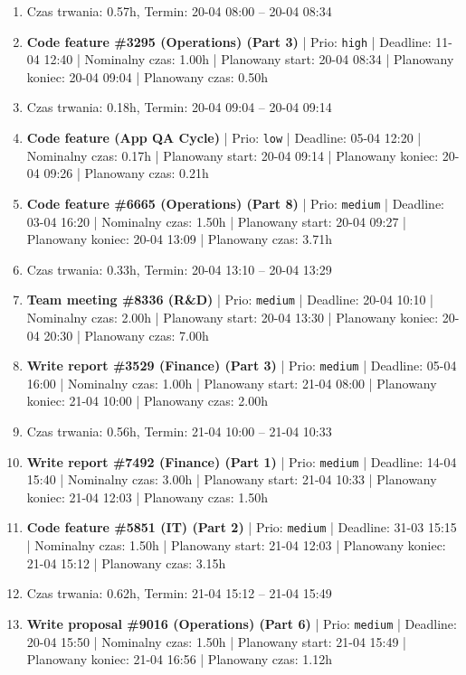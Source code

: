 {\begin{enumerate}
  \item [\textbf{PRZERWA}] Czas trwania: 0.57h, Termin: 20-04 08:00 -- 20-04 08:34
  \item [\textbf{14608}] \textbf{Code feature \#3295 (Operations) (Part 3)} | Prio: \texttt{high} | Deadline: 11-04 12:40 | Nominalny czas: 1.00h | Planowany start: 20-04 08:34 | Planowany koniec: 20-04 09:04 | Planowany czas: 0.50h
  \item [\textbf{PRZERWA}] Czas trwania: 0.18h, Termin: 20-04 09:04 -- 20-04 09:14
  \item [\textbf{14703}] \textbf{Code feature (App QA Cycle)} | Prio: \texttt{low} | Deadline: 05-04 12:20 | Nominalny czas: 0.17h | Planowany start: 20-04 09:14 | Planowany koniec: 20-04 09:26 | Planowany czas: 0.21h
  \item [\textbf{14667}] \textbf{Code feature \#6665 (Operations) (Part 8)} | Prio: \texttt{medium} | Deadline: 03-04 16:20 | Nominalny czas: 1.50h | Planowany start: 20-04 09:27 | Planowany koniec: 20-04 13:09 | Planowany czas: 3.71h
  \item [\textbf{PRZERWA}] Czas trwania: 0.33h, Termin: 20-04 13:10 -- 20-04 13:29
  \item [\textbf{14649}] \textbf{Team meeting \#8336 (R\&D)} | Prio: \texttt{medium} | Deadline: 20-04 10:10 | Nominalny czas: 2.00h | Planowany start: 20-04 13:30 | Planowany koniec: 20-04 20:30 | Planowany czas: 7.00h
  \item [\textbf{14672}] \textbf{Write report \#3529 (Finance) (Part 3)} | Prio: \texttt{medium} | Deadline: 05-04 16:00 | Nominalny czas: 1.00h | Planowany start: 21-04 08:00 | Planowany koniec: 21-04 10:00 | Planowany czas: 2.00h
  \item [\textbf{PRZERWA}] Czas trwania: 0.56h, Termin: 21-04 10:00 -- 21-04 10:33
  \item [\textbf{14642}] \textbf{Write report \#7492 (Finance) (Part 1)} | Prio: \texttt{medium} | Deadline: 14-04 15:40 | Nominalny czas: 3.00h | Planowany start: 21-04 10:33 | Planowany koniec: 21-04 12:03 | Planowany czas: 1.50h
  \item [\textbf{14643}] \textbf{Code feature \#5851 (IT) (Part 2)} | Prio: \texttt{medium} | Deadline: 31-03 15:15 | Nominalny czas: 1.50h | Planowany start: 21-04 12:03 | Planowany koniec: 21-04 15:12 | Planowany czas: 3.15h
  \item [\textbf{PRZERWA}] Czas trwania: 0.62h, Termin: 21-04 15:12 -- 21-04 15:49
  \item [\textbf{14662}] \textbf{Write proposal \#9016 (Operations) (Part 6)} | Prio: \texttt{medium} | Deadline: 20-04 15:50 | Nominalny czas: 1.50h | Planowany start: 21-04 15:49 | Planowany koniec: 21-04 16:56 | Planowany czas: 1.12h

\end{enumerate}}
